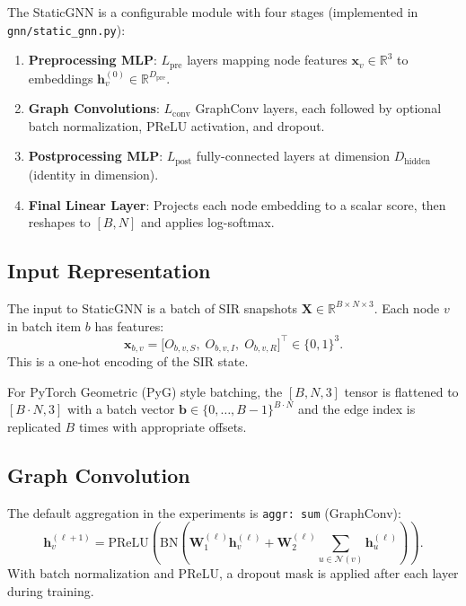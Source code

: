 \documentclass[12pt,a4paper]{report}
\newcommand{\R}{\mathbb{R}}
\newcommand{\bh}{\mathbf{h}}
\newcommand{\bx}{\mathbf{x}}
\newcommand{\bW}{\mathbf{W}}
\newcommand{\calN}{\mathcal{N}}
\begin{document}
The StaticGNN is a configurable module with four stages (implemented in
\texttt{gnn/static\_gnn.py}):

\begin{enumerate}
  \item \textbf{Preprocessing MLP}: $L_{\text{pre}}$ layers mapping node
    features $\bx_v \in \R^3$ to embeddings $\bh_v^{(0)} \in \R^{D_{\text{pre}}}$.
  \item \textbf{Graph Convolutions}: $L_{\text{conv}}$ GraphConv layers,
    each followed by optional batch normalization, PReLU activation, and dropout.
  \item \textbf{Postprocessing MLP}: $L_{\text{post}}$ fully-connected layers
    at dimension $D_{\text{hidden}}$ (identity in dimension).
  \item \textbf{Final Linear Layer}: Projects each node embedding to a scalar
    score, then reshapes to $[B, N]$ and applies log-softmax.
\end{enumerate}

\subsection{Input Representation}

The input to StaticGNN is a batch of SIR snapshots
$\mathbf{X} \in \R^{B \times N \times 3}$. Each node $v$ in batch item $b$ has
features:
\begin{equation}
  \bx_{b,v} = \bigl[O_{b,v,S},\; O_{b,v,I},\; O_{b,v,R}\bigr]^\top \in \{0,1\}^3.
\end{equation}
This is a one-hot encoding of the SIR state.

For PyTorch Geometric (PyG) style batching, the $[B, N, 3]$ tensor is
flattened to $[B \cdot N, 3]$ with a batch vector $\mathbf{b} \in \{0,\ldots,B-1\}^{B \cdot N}$
and the edge index is replicated $B$ times with appropriate offsets.

\subsection{Graph Convolution}

The default aggregation in the experiments is \texttt{aggr: sum} (GraphConv):
\begin{equation}
  \bh_v^{(\ell+1)} = \text{PReLU}\!\left(\text{BN}\!\left(\bW_1^{(\ell)} \bh_v^{(\ell)} + \bW_2^{(\ell)} \sum_{u \in \calN(v)} \bh_u^{(\ell)}\right)\right).
  \label{eq:static_gnn_conv}
\end{equation}
With batch normalization and PReLU, a dropout mask is applied after each layer
during training.
\end{document}
